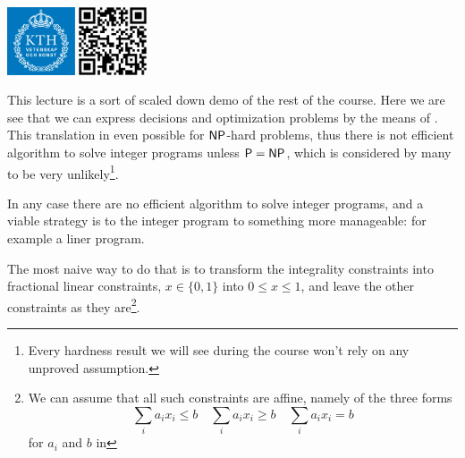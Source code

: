 \documentclass[a4paper,twoside,justified]{tufte-handout}
\begin{document}
 
\maketitle
\thispagestyle{fancy}
\begin{marginfigure}
\begin{center}
\includegraphics[width=2cm]{kth.pdf}
\hspace*{1em}
\includegraphics[width=2cm]{qrcode.pdf}
\end{center}
\end{marginfigure}

\begin{abstract}
  \emph{\DataAbstract}
\end{abstract}


This lecture is a sort of scaled down demo of the rest of the
course. Here we are see that we can express decisions and optimization
problems by the means of . This translation in
even possible for $ \mathsf{NP} $-hard problems, thus there is not efficient
algorithm to solve integer programs unless $\mathsf{P}=\mathsf{NP}$, which is
considered by many to be very unlikely\footnote{Every hardness result
  we will see during the course won't rely on any unproved assumption.}.

In any case there are no  efficient algorithm to
solve integer programs, and a viable strategy is to
 the integer program to something more
manageable: for example a liner program.

The most naive way to do that is to transform the integrality
constraints into fractional linear constraints, \eg $ x \in\{0,1\} $
into $ 0 \leq x \leq 1 $, and leave the other constraints as they
are\footnote{We can assume that all such constraints are affine,
  namely of the three forms
  \begin{equation*}
    \sum_{i}a_{i}x_{i} \leq b \quad   \sum_{i}a_{i}x_{i} \geq b \quad \sum_{i}a_{i}x_{i} = b
  \end{equation*}
  for $a_i$ and $ b $ in \RR}.
\end{document}
